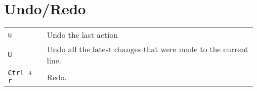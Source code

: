 \section{Undo/Redo}
\begin{tabular}{@{}p{\the\MyLen}%
 @{}p{\linewidth-\the\MyLen}}
\verb!u!		& Undo the last action\\
\verb!U!		& Undo all the latest changes that were made to the current line.\\
\verb!Ctrl + r! 	& Redo.\\
\end{tabular}
